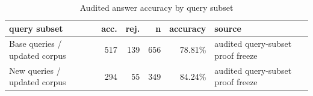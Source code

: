 \begin{table}[htbp]
\centering
\footnotesize
\setlength{\tabcolsep}{3pt}
\caption{Audited answer accuracy by query subset}
\label{tab:d5c-query-subset}
\begin{tabularx}{\linewidth}{>{\raggedright\arraybackslash}Xrrrr>{\raggedright\arraybackslash}X}
\toprule
query subset & acc. & rej. & n & accuracy & source \\
\midrule
Base queries / updated corpus & 517 & 139 & 656 & 78.81\% & audited query-subset proof freeze \\
New queries / updated corpus & 294 & 55 & 349 & 84.24\% & audited query-subset proof freeze \\
\bottomrule
\end{tabularx}
\end{table}
